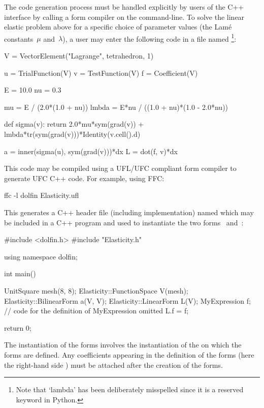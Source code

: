 The code generation process must be handled explicitly by users of the C++
interface by calling a form compiler on the command-line. To solve the
linear elastic problem above for a specific choice of parameter values
(the Lam\'e constants~$\mu$ and~$\lambda$), a user may enter the following
code in a file named \footnote{Note that `lambda'
has been deliberately misspelled since it is a reserved keyword
in Python.}:
\begin{uflcode}
V = VectorElement("Lagrange", tetrahedron, 1)

u = TrialFunction(V)
v = TestFunction(V)
f = Coefficient(V)

E  = 10.0
nu = 0.3

mu    = E / (2.0*(1.0 + nu))
lmbda = E*nu / ((1.0 + nu)*(1.0 - 2.0*nu))

def sigma(v):
    return 2.0*mu*sym(grad(v)) + lmbda*tr(sym(grad(v)))*Identity(v.cell().d)

a = inner(sigma(u), sym(grad(v)))*dx
L = dot(f, v)*dx
\end{uflcode}
This code may be compiled using a UFL/UFC compliant form compiler to
generate UFC C++ code. For example, using FFC:
\begin{bash}
ffc -l dolfin Elasticity.ufl
\end{bash}
This generates a C++ header file (including implementation) named
 which may be included in a C++ program and used to
instantiate the two forms~ and~:
\begin{c++}
#include <dolfin.h>
#include "Elasticity.h"

using namespace dolfin;

int main()
{
  UnitSquare mesh(8, 8);
  Elasticity::FunctionSpace V(mesh);
  Elasticity::BilinearForm a(V, V);
  Elasticity::LinearForm L(V);
  MyExpression f; // code for the definition of MyExpression omitted
  L.f = f;

  return 0;
}
\end{c++}
The instantiation of the forms involves the instantiation of the
 on which the forms are defined. Any coefficients
appearing in the definition of the forms (here the right-hand side
) must be attached after the creation of the forms.

